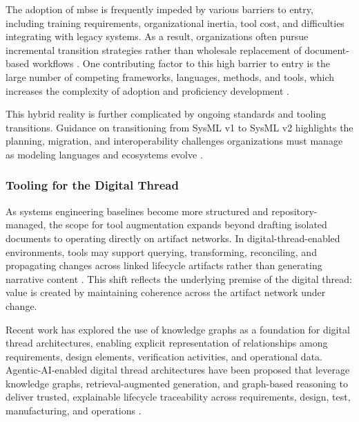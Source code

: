 The adoption of \ac{mbse} is frequently impeded by various barriers to entry, including training requirements, organizational inertia, tool cost, and difficulties integrating with legacy systems. As a result, organizations often pursue incremental transition strategies rather than wholesale replacement of document-based workflows \cite{systems_engineering_guidebook_2021, vaneman_mbse_demystified_2025}. One contributing factor to this high barrier to entry is the large number of competing frameworks, languages, methods, and tools, which increases the complexity of adoption and proficiency development \cite{OMG_UAF_1.3_2025,
chiefinformationofficer_DoDAFArchitectureFramework_2010,
zachman_ZachmanFrameworkEnterprise_2003, OMG_UML_2_5_1_2017, LML_Specification_2_0_2025, OMG_UPDM_2_1_2016, OMG_KerML_1_0_2025, OMG_BPMN_2_0_2_2014, Dassault_Cameo_Systems_Modeler_2025, Eclipse_Capella_Project_Capella_2026, Ansys_System_Architecture_Modeler_SAM_2026, IBM_Engineering_Rhapsody_2026, Spec_Innovations_Innoslate_2026, OpenMBEE_OpenMBEE_2026, PTC_PTC_Modeler_2026, MathWorks_System_Composer_2026}.

This hybrid reality is further complicated by ongoing standards and tooling transitions. Guidance on transitioning from SysML v1 to SysML v2 highlights the planning, migration, and interoperability challenges organizations must manage as modeling languages and ecosystems evolve \cite{OUSDRE_SysMLV1SysML2_2024, friedenthal_MovingForwardSysMLV2_2024, zhang_MBSE20More_2025}.


\subsubsection{Tooling for the Digital Thread}
\label{subsubsec:ch2_tool_for_digital_thread}

As systems engineering baselines become more structured and repository-managed, the scope for tool augmentation expands beyond drafting isolated documents to operating directly on artifact networks. In digital-thread-enabled environments, tools may support querying, transforming, reconciling, and propagating changes across linked lifecycle artifacts rather than generating narrative content \cite{kumar_AIEnabledDigital_2023}. This shift reflects the underlying premise of the digital thread: value is created by maintaining coherence across the artifact network under change.

Recent work has explored the use of knowledge graphs as a foundation for digital thread architectures, enabling explicit representation of relationships among requirements, design elements, verification activities, and operational data. Agentic-AI-enabled digital thread architectures have been proposed that leverage knowledge graphs, retrieval-augmented generation, and graph-based reasoning to deliver trusted, explainable lifecycle traceability across requirements, design, test, manufacturing, and operations \cite{kumar_AIEnabledDigital_2023, Jaskie_Agentic_AI_Lifecycle_Traceability_Digital_Thread_2025, Lipizzi_LLM_Augmented_Pipelines_Validated_System_Model_Creation_2025, Helmerich_Transforming_Systems_Engineering_Agentic_AI_2025}. 

